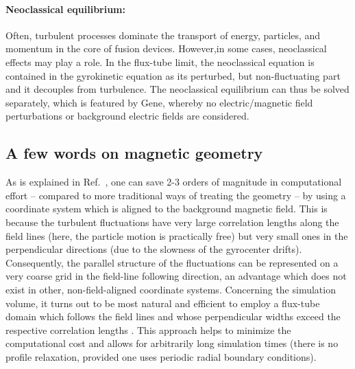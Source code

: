 \documentclass[12pt]{article}
\begin{document}
\paragraph{Neoclassical equilibrium:}

Often, turbulent processes dominate the transport of energy, particles, and momentum
in the core of fusion devices. However,in some cases, neoclassical effects may play a role.
In the flux-tube limit, the neoclassical equation is contained in the
gyrokinetic equation
as its perturbed, but non-fluctuating part and it decouples from turbulence.
The neoclassical equilibrium can thus be solved separately, which is
featured by {\sc Gene}, whereby no electric/magnetic field perturbations or background
electric fields are considered.

\subsection{A few words on magnetic geometry}

As is explained in Ref.~\cite{beer}, one can save 2-3 orders of
magnitude in computational effort -- compared to more traditional
ways of treating the geometry -- by using a coordinate system
which is aligned to the background magnetic field. This is because
the turbulent fluctuations have very large correlation lengths
along the field lines (here, the particle motion is practically
free) but very small ones in the perpendicular directions (due to
the slowness of the gyrocenter drifts). Consequently, the parallel
structure of the fluctuations can be represented on a very coarse
grid in the field-line following direction, an advantage which
does not exist in other, non-field-aligned coordinate systems.
Concerning the simulation volume, it turns out to be most natural
and efficient to employ a flux-tube domain which follows the field
lines and whose perpendicular widths exceed the respective
correlation lengths \cite{beer}. This approach helps to minimize
the computational cost and allows for arbitrarily long simulation
times (there is no profile relaxation, provided one uses periodic
radial boundary conditions).
\end{document}
